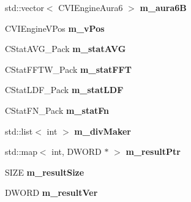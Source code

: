 \begin{DoxyCompactItemize}
\item 
\hypertarget{class_c_v_i_engine_base_a4415e8a105218982c6358907ae6f380e}{std\+::vector$<$ C\+V\+I\+Engine\+Aura6 $>$ {\bfseries m\+\_\+aura6\+B}}\label{class_c_v_i_engine_base_a4415e8a105218982c6358907ae6f380e}

\item 
\hypertarget{class_c_v_i_engine_base_afab397345881a9b8a44e6f8eae9805f0}{C\+V\+I\+Engine\+V\+Pos {\bfseries m\+\_\+v\+Pos}}\label{class_c_v_i_engine_base_afab397345881a9b8a44e6f8eae9805f0}

\item 
\hypertarget{class_c_v_i_engine_base_aad8ff35fe2bc6a8d6da03b8f93ea3341}{C\+Stat\+A\+V\+G\+\_\+\+Pack {\bfseries m\+\_\+stat\+A\+V\+G}}\label{class_c_v_i_engine_base_aad8ff35fe2bc6a8d6da03b8f93ea3341}

\item 
\hypertarget{class_c_v_i_engine_base_a475ef6e1419c21ec5d68097a4cd822ee}{C\+Stat\+F\+F\+T\+W\+\_\+\+Pack {\bfseries m\+\_\+stat\+F\+F\+T}}\label{class_c_v_i_engine_base_a475ef6e1419c21ec5d68097a4cd822ee}

\item 
\hypertarget{class_c_v_i_engine_base_abb0ef36905047eafd79bea2911824b7f}{C\+Stat\+L\+D\+F\+\_\+\+Pack {\bfseries m\+\_\+stat\+L\+D\+F}}\label{class_c_v_i_engine_base_abb0ef36905047eafd79bea2911824b7f}

\item 
\hypertarget{class_c_v_i_engine_base_a8628211a0ca23ea36cf4059f3ab47f74}{C\+Stat\+F\+N\+\_\+\+Pack {\bfseries m\+\_\+stat\+Fn}}\label{class_c_v_i_engine_base_a8628211a0ca23ea36cf4059f3ab47f74}

\item 
\hypertarget{class_c_v_i_engine_base_a63cd16114d368eec7c2bce4c4ac8e9c8}{std\+::list$<$ int $>$ {\bfseries m\+\_\+div\+Maker}}\label{class_c_v_i_engine_base_a63cd16114d368eec7c2bce4c4ac8e9c8}

\item 
\hypertarget{class_c_v_i_engine_base_a40a1749d972d33216c2ded69498cc0b1}{std\+::map$<$ int, D\+W\+O\+R\+D $\ast$ $>$ {\bfseries m\+\_\+result\+Ptr}}\label{class_c_v_i_engine_base_a40a1749d972d33216c2ded69498cc0b1}

\item 
\hypertarget{class_c_v_i_engine_base_aec00e6d3113182f3193b3b4345c4e433}{S\+I\+Z\+E {\bfseries m\+\_\+result\+Size}}\label{class_c_v_i_engine_base_aec00e6d3113182f3193b3b4345c4e433}

\item 
\hypertarget{class_c_v_i_engine_base_a756c886b931c2c905085558d219d4045}{D\+W\+O\+R\+D {\bfseries m\+\_\+result\+Ver}}\label{class_c_v_i_engine_base_a756c886b931c2c905085558d219d4045}


\end{DoxyCompactItemize}
